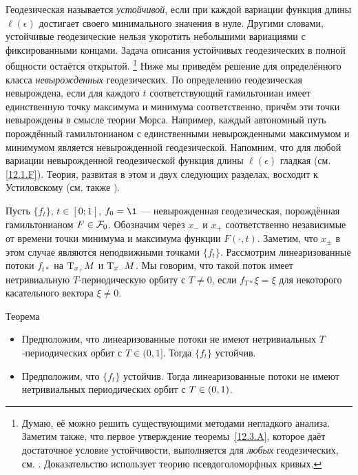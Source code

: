 Геодезическая называется \emph{устойчивой}, если при каждой вариации функция
длины $\ell(\epsilon)$ достигает своего минимального значения в нуле. 
Другими словами, устойчивые геодезические нельзя укоротить небольшими
вариациями с фиксированными концами. 
Задача описания устойчивых геодезических в полной общности остаётся открытой.%
\footnote{Думаю, её можно решить существующими методами негладкого анализа.
Заметим также, что первое утверждение теоремы~\ref{12.3.A},
которое даёт достаточное условие устойчивости, выполняется для
{}\emph{любых} геодезических, см. \cite{LM3}.  
Доказательство использует теорию псевдоголоморфных кривых.}
Ниже мы приведём решение для определённого класса
\emph{невырожденных}
геодезических. 
По определению геодезическая невырождена, если для каждого $t$
соответствующий гамильтониан имеет единственную точку максимума и
минимума соответственно, причём эти точки невырождены в смысле теории
Морса. 
Например, каждый автономный путь порождённый гамильтонианом с единственными невырожденными максимумом и минимумом является невырожденной геодезической. 
Напомним, что для любой вариации невырожденной геодезической функция длины $\ell(\epsilon)$ гладкая (см. \ref{12.1.F}). 
Теория, развитая в этом и двух следующих разделах, восходит к
Устиловскому \cite{U} (см. также
\cite{LM2}). 

Пусть $\{f_t\}$, $t \in [0; 1]$, $f_0 = \1$ — невырожденная
геодезическая, порождённая гамильтонианом $F\in \mathcal{F}_0$. 
Обозначим через $x_-$ и $x_+$ соответственно независимые от времени
точки минимума и максимума функции $F(\cdot, t)$. 
Заметим, что $x_\pm$ в этом случае являются неподвижными точками $\{f_t\}$.
Рассмотрим линеаризованные потоки $f_{t*}$ на $\mathrm{T}_{x_+}M$ и $\mathrm{T}_{x_-}M$.
Мы говорим, что такой поток имеет нетривиальную $T$-периодическую
орбиту с $T\ne0$, если $f_{T*}\xi=\xi$ для некоторого касательного
вектора $\xi\ne0$. 

\begin{thm}[(\cite{U})]{Теорема}\label{12.3.A}

\begin{itemize}
\item Предположим, что линеаризованные потоки не имеют нетривиальных $T$-периодических орбит с $T\in(0,1]$.
Тогда $\{f_t\}$ устойчив.
\item Предположим, что $\{f_t\}$ устойчив.
Тогда линеаризованные потоки не имеют нетривиальных периодических орбит с $T\z\in(0,1)$.
\end{itemize}
\end{thm}

